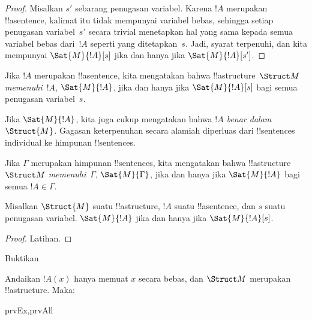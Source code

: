 \documentclass[../../../include/open-logic-section]{subfiles}
\begin{document}
\begin{proof}
  Misalkan $s'$ sebarang penugasan variabel. Karena $!A$ merupakan
  !!a{sentence}, kalimat itu tidak mempunyai variabel bebas, sehingga setiap
  penugasan variabel~$s'$ secara trivial menetapkan hal yang sama kepada
  semua variabel bebas dari~$!A$ seperti yang ditetapkan~$s$. Jadi, syarat
   terpenuhi, dan kita mempunyai
  $\Sat{M}{!A}[s]$ jika dan hanya jika $\Sat{M}{!A}[s']$.
\end{proof}

\begin{defn}
Jika $!A$ merupakan !!a{sentence}, kita mengatakan bahwa
!!a{structure}~$\Struct M$ \emph{memenuhi}~$!A$, $\Sat{M}{!A}$, jika dan
hanya jika $\Sat{M}{!A}[s]$ bagi semua penugasan variabel~$s$.
\end{defn}

Jika $\Sat{M}{!A}$, kita juga cukup mengatakan bahwa \emph{$!A$ benar
dalam~$\Struct{M}$.} Gagasan keterpenuhan secara alamiah diperluas dari
!!{sentence}s individual ke himpunan !!{sentence}s.

\begin{defn}
Jika $\Gamma$ merupakan himpunan !!{sentence}s, kita mengatakan
bahwa !!a{structure}~$\Struct M$ \emph{memenuhi}~$\Gamma$,
$\Sat{M}{\Gamma}$, jika dan hanya jika $\Sat{M}{!A}$ bagi semua
$!A \in \Gamma$.
\end{defn}

\begin{prop}
  Misalkan $\Struct{M}$ suatu !!a{structure}, $!A$ suatu !!a{sentence}, dan
  $s$ suatu penugasan variabel. $\Sat{M}{!A}$ jika dan hanya jika
  $\Sat{M}{!A}[s]$.
\end{prop}

\begin{proof}
Latihan.
\end{proof}

\begin{prob}
Buktikan 
\end{prob}

\begin{prop}
  Andaikan $!A(x)$ hanya memuat $x$ secara bebas, dan $\Struct M$ merupakan
  !!a{structure}. Maka:
  \begin{tagenumerate}{prvEx,prvAll}
\end{tagenumerate}
\end{prop}
\end{document}

